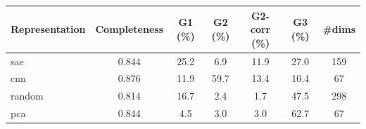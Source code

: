 \begin{tabular}{lcccccc}
\toprule
Representation & Completeness & G1 (\%) & G2 (\%) & G2-corr (\%) & G3 (\%) & \#dims \\
\midrule
sae & 0.844 & 25.2 & 6.9 & 11.9 & 27.0 & 159 \\
cnn & 0.876 & 11.9 & 59.7 & 13.4 & 10.4 & 67 \\
random & 0.814 & 16.7 & 2.4 & 1.7 & 47.5 & 298 \\
pca & 0.844 & 4.5 & 3.0 & 3.0 & 62.7 & 67 \\
\bottomrule
\end{tabular}